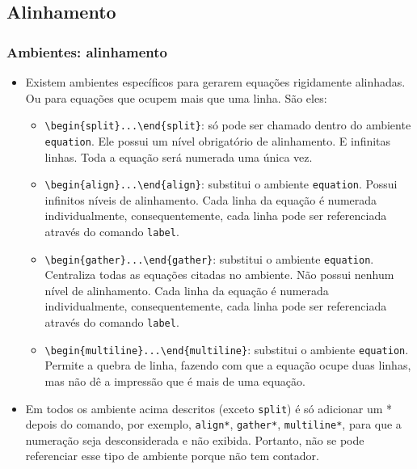 \documentclass[brazilian]{beamer}
\begin{document}
\subsection{Alinhamento}
\begin{frame}
    \frametitle{Ambientes: alinhamento}

    \begin{itemize}
        \item Existem ambientes específicos para gerarem equações rigidamente alinhadas. Ou para equações que ocupem mais que uma linha. São eles:
        \begin{itemize}
            \item \lstinline[style=myStyleLatex]!\begin{split}...\end{split}!: só pode ser chamado dentro do ambiente \texttt{equation}. Ele possui um nível obrigatório de alinhamento. E infinitas linhas. Toda a equação será numerada uma única vez.
            \item \lstinline[style=myStyleLatex]!\begin{align}...\end{align}!: substitui o ambiente \texttt{equation}. Possui infinitos níveis de alinhamento. Cada linha da equação é numerada individualmente, consequentemente, cada linha pode ser referenciada através do comando \texttt{label}.
            \item \lstinline[style=myStyleLatex]!\begin{gather}...\end{gather}!: substitui o ambiente \texttt{equation}. Centraliza todas as equações citadas no ambiente. Não possui nenhum nível de alinhamento. Cada linha da equação é numerada individualmente, consequentemente, cada linha pode ser referenciada através do comando \texttt{label}.
            \item \lstinline[style=myStyleLatex]!\begin{multiline}...\end{multiline}!: substitui o ambiente \texttt{equation}. Permite a quebra de linha, fazendo com que a equação ocupe duas linhas, mas não dê a impressão que é mais de uma equação. 
        \end{itemize} 
        \item Em todos os ambiente acima descritos (exceto \texttt{split}) é só adicionar um * depois do comando, por exemplo, \texttt{align*}, \texttt{gather*}, \texttt{multiline*}, para que a numeração seja desconsiderada e não exibida. Portanto, não se pode referenciar esse tipo de ambiente porque não tem contador.  
    \end{itemize}

\end{frame}
\end{document}
